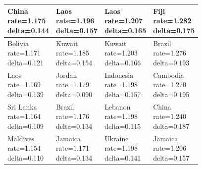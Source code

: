 \documentclass[runningheads]{llncs}
\begin{document}
{\begin{longtable}{p{}p{}p{}p{}}
\hline
\shortstack[l]{China\\ rate=1.175\\ delta=0.144} &\shortstack[l]{Laos\\ rate=1.196\\ delta=0.157} &\shortstack[l]{Laos\\ rate=1.207\\ delta=0.165} &\shortstack[l]{Fiji\\ rate=1.282\\ delta=0.175} \\
\hline
\shortstack[l]{Bolivia\\ rate=1.171\\ delta=0.121} &\shortstack[l]{Kuwait\\ rate=1.185\\ delta=0.154} &\shortstack[l]{Kuwait\\ rate=1.203\\ delta=0.166} &\shortstack[l]{Brazil\\ rate=1.276\\ delta=0.193} \\
\hline
\shortstack[l]{Laos\\ rate=1.169\\ delta=0.139} &\shortstack[l]{Jordan\\ rate=1.179\\ delta=0.090} &\shortstack[l]{Indonesia\\ rate=1.198\\ delta=0.157} &\shortstack[l]{Cambodia\\ rate=1.270\\ delta=0.195} \\
\hline
\shortstack[l]{Sri Lanka\\ rate=1.164\\ delta=0.109} &\shortstack[l]{Brazil\\ rate=1.176\\ delta=0.134} &\shortstack[l]{Lebanon\\ rate=1.198\\ delta=0.115} &\shortstack[l]{China\\ rate=1.240\\ delta=0.187} \\
\hline
\shortstack[l]{Maldives\\ rate=1.154\\ delta=0.110} &\shortstack[l]{Jamaica\\ rate=1.171\\ delta=0.134} &\shortstack[l]{Ukraine\\ rate=1.198\\ delta=0.141} &\shortstack[l]{Jamaica\\ rate=1.206\\ delta=0.157} \\

\end{longtable}}
\end{document}
